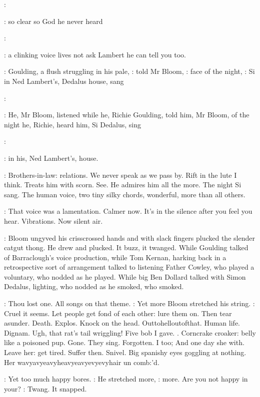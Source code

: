 \simon:

\BloomInt:
so clear so God he never heard

\simon:

\BloomInt:
a clinking voice lives
not ask Lambert he can tell you too.

:
Goulding,
a flush struggling in his pale,
:
told Mr Bloom,
:
face of the night,
\goulding:
Si in Ned Lambert's,
Dedalus house,
sang

\simon:

:
He,
Mr Bloom,
listened while he,
Richie Goulding,
told him,
Mr
Bloom,
of the night he,
Richie,
heard him,
Si Dedalus,
sing

\simon:

:
in his,
Ned Lambert's,
house.

\BloomInt:
Brothers-in-law:
relations.
We never speak as we pass by.
Rift in the
lute I think.
Treats him with scorn.
See.
He admires him all the more.
The
night Si sang.
The human voice,
two tiny silky chords,
wonderful,
more
than all others.

\BloomInt:
That voice was a lamentation.
Calmer now.
It's in the silence after
you feel you hear.
Vibrations.
Now silent air.

:
Bloom ungyved his crisscrossed hands and with slack fingers plucked
the slender catgut thong.
He drew and plucked.
It buzz,
it twanged.
While
Goulding talked of Barraclough's voice production,
while Tom Kernan,
harking back in a retrospective sort of arrangement talked to listening
Father Cowley,
who played a voluntary,
who nodded as he played.
While
big Ben Dollard talked with Simon Dedalus,
lighting,
who nodded as he
smoked,
who smoked.

\BloomInt:
Thou lost one.
All songs on that theme.
:
Yet more Bloom stretched his string.
\BloomInt:
Cruel it seems.
Let people get fond of each other:
lure them on.
Then tear asunder.
Death.
Explos.
Knock on the head.
Outtohelloutofthat.
Human life.
Dignam.
Ugh,
that rat's tail wriggling!
Five bob I gave.
.
Corncrake croaker:
belly like a poisoned pup.
Gone.
They sing.
Forgotten.
I too; And one day she with.
Leave her:
get tired.
Suffer then.
Snivel.
Big spanishy eyes goggling at nothing.
Her
wavyavyeavyheavyeavyevyevyhair un comb:'d.

\BloomInt:
Yet too much happy bores.
:
He stretched more,
\BloomInt:
more.
Are you not happy in your?
:
Twang.
It snapped.

